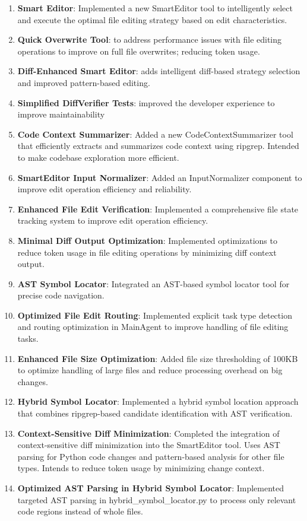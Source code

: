 \begin{enumerate}
    \item \textbf{Smart Editor}: Implemented a new SmartEditor tool to
intelligently select and execute the optimal file editing strategy based on edit
characteristics.
    \item \textbf{Quick Overwrite Tool}: to address performance issues with file editing
        operations to improve on full file overwrites; reducing token usage.
    \item \textbf{Diff-Enhanced Smart Editor}: adds intelligent diff-based
        strategy selection and improved pattern-based editing.
    \item \textbf{Simplified DiffVerifier Tests}: improved the developer
        experience to improve maintainability
    \item \textbf{Code Context Summarizer}: Added a new CodeContextSummarizer
        tool that efficiently extracts and summarizes code context using
        ripgrep. Intended to make codebase exploration more efficient.
    \item \textbf{SmartEditor Input Normalizer}: Added an InputNormalizer
        component to improve edit operation efficiency and reliability.
    \item \textbf{Enhanced File Edit Verification}: Implemented a comprehensive
        file state tracking system to improve edit operation efficiency.
    \item \textbf{Minimal Diff Output Optimization}: Implemented optimizations
        to reduce token usage in file editing operations by minimizing diff
        context output.
    \item \textbf{AST Symbol Locator}: Integrated an AST-based symbol locator
        tool for precise code navigation.
    \item \textbf{Optimized File Edit Routing}: Implemented explicit task type
detection and routing optimization in MainAgent to improve handling of file
editing tasks.
    \item \textbf{Enhanced File Size Optimization}: Added file size thresholding
        of 100KB to optimize handling of large files and reduce processing
        overhead on big changes.
    \item \textbf{Hybrid Symbol Locator}: Implemented a hybrid symbol location
        approach that combines ripgrep-based candidate identification with AST
        verification.
    \item \textbf{Context-Sensitive Diff Minimization}: Completed the
        integration of context-sensitive diff minimization into the SmartEditor
        tool. Uses AST parsing for Python code changes and pattern-based
        analysis for other file types. Intends to reduce token usage by
        minimizing change context.
    \item \textbf{Optimized AST Parsing in Hybrid Symbol Locator}: Implemented
        targeted AST parsing in hybrid\_symbol\_locator.py to process only
        relevant code regions instead of whole files.
\end{enumerate}
